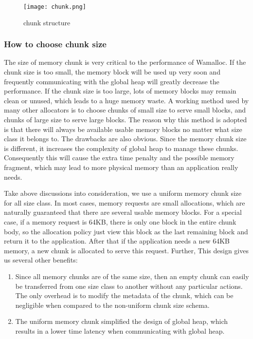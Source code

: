 \documentclass{vldb}
\begin{document}
\begin{figure}[h]
\centering
\texttt{[image: chunk.png]}
\caption{chunk structure}
\label{fig:chunk}
\end{figure}

\subsubsection{How to choose chunk size}
The size of memory chunk is very critical to the performance of Wamalloc. 
If the chunk size is too small, the memory block will be used up very soon and frequently communicating with the global heap will greatly decrease the performance.
If the chunk size is too large, lots of memory blocks may remain clean or unused, which leads to a huge memory waste. 
A working method used by many other allocators is to choose chunks of small size to serve small blocks, and chunks of large size to serve large blocks.
The reason why this method is adopted is that there will always be available usable memory blocks no matter what size class it belongs to.
The drawbacks are also obvious.
Since the memory chunk size is different, it increases the complexity of global heap to manage these chunks.
Consequently this will cause the extra time penalty and the possible memory fragment, which may lead to more physical memory than an application really needs.

Take above discussions into consideration, we use a uniform memory chunk size for all size class. 
In most cases, memory requests are small allocations, which are naturally guaranteed that there are several usable memory blocks. 
For a special case, if a memory request is 64KB, there is only one block in the entire chunk body, so the allocation policy just view this block as the last remaining block 
and return it to the application. 
After that if the application needs a new 64KB memory, a new chunk is allocated to serve this request.
Further, This design gives us several other benefits: 
\begin{enumerate}
    \item Since all memory chunks are of the same size, then an empty chunk can easily be transferred from one size class to another without any particular actions.
The only overhead is to modify the metadata of the chunk, which can be negligible when compared to the non-uniform chunk size schema. 
    \item The uniform memory chunk simplified the design of global heap, which results in a lower time latency when communicating with global heap.
\end{enumerate}
\end{document}
